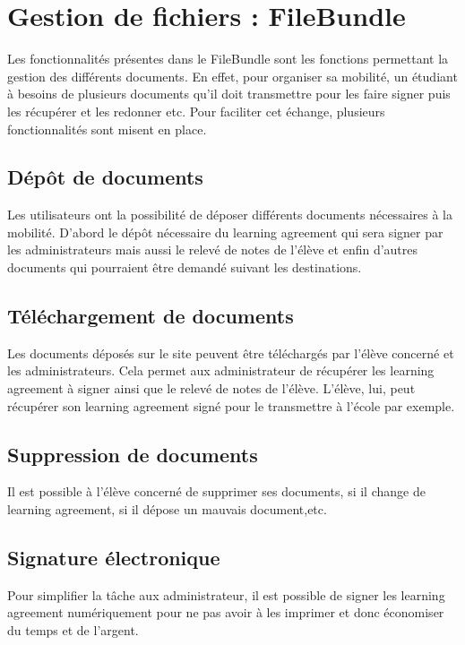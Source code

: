 \chapter{Gestion de fichiers : FileBundle}

Les fonctionnalités présentes dans le FileBundle sont les fonctions permettant la gestion des différents documents. En effet, pour organiser sa mobilité, un étudiant à besoins de plusieurs documents qu'il doit transmettre pour les faire signer puis les récupérer et les redonner etc. Pour faciliter cet échange, plusieurs fonctionnalités sont misent en place.

\section{Dépôt de documents}

Les utilisateurs ont la possibilité de déposer différents documents nécessaires à la mobilité. D'abord le dépôt nécessaire du learning agreement qui sera signer par les administrateurs mais aussi le relevé de notes de l'élève et enfin d'autres documents qui pourraient être demandé suivant les destinations.

\section{Téléchargement de documents}

Les documents déposés sur le site peuvent être téléchargés par l'élève concerné et les administrateurs. Cela permet aux administrateur de récupérer les learning agreement à signer ainsi que le relevé de notes de l'élève. L'élève, lui, peut récupérer son learning agreement signé pour le transmettre à l'école par exemple.

\section{Suppression de documents}

Il est possible à l'élève concerné de supprimer ses documents, si il change de learning agreement, si il dépose un mauvais document,etc. 

\section{Signature électronique}

Pour simplifier la tâche aux administrateur, il est possible de signer les learning agreement numériquement pour ne pas avoir à les imprimer et donc économiser du temps et de l'argent.